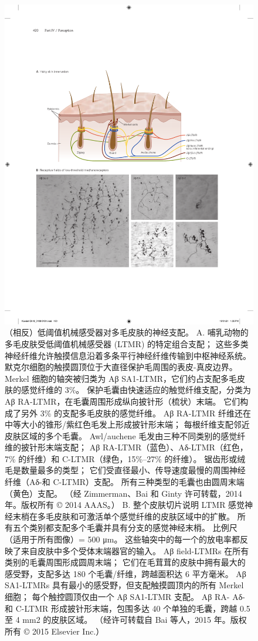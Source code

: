 \begin{figure}[htbp]
	\centering
	\includegraphics[width=1.0\linewidth]{chap18/fig_18_8}
	\caption{（相反）低阈值机械感受器对多毛皮肤的神经支配。
		A. 哺乳动物的多毛皮肤受低阈值机械感受器 (LTMR) 的特定组合支配； 这些多类神经纤维允许触摸信息沿着多条平行神经纤维传输到中枢神经系统。
		默克尔细胞的触摸圆顶位于大直径保护毛周围的表皮-真皮边界。
		Merkel 细胞的轴突被归类为 Aβ SA1-LTMR，它们约占支配多毛皮肤的感觉纤维的 3\%。
		保护毛囊由快速适应的触觉纤维支配，分类为 Aβ RA-LTMR，在毛囊周围形成纵向披针形（梳状）末端。
		它们构成了另外 3\% 的支配多毛皮肤的感觉纤维。
		Aβ RA-LTMR 纤维还在中等大小的锥形/紫红色毛发上形成披针形末端； 每根纤维支配邻近皮肤区域的多个毛囊。
		Awl/auchene 毛发由三种不同类别的感觉纤维的披针形末端支配； Aβ RA-LTMR（蓝色）、Aδ-LTMR（红色，7\% 的纤维）和 C-LTMR（绿色，15\%–27\% 的纤维）。
		锯齿形或绒毛是数量最多的类型； 它们受直径最小、传导速度最慢的周围神经纤维（Aδ-和 C-LTMR）支配。 
		所有三种类型的毛囊也由圆周末端（黄色）支配。 （经 Zimmerman、Bai 和 Ginty 许可转载，2014 年。版权所有 © 2014 AAAS。）
		B. 整个皮肤切片说明 LTMR 感觉神经末梢在多毛皮肤和可激活单个感觉纤维的皮肤区域中的扩散。
		所有五个类别都支配多个毛囊并具有分支的感觉神经末梢。
		比例尺（适用于所有图像）= 500 μm。 
		这些轴突中的每一个的放电率都反映了来自皮肤中多个受体末端器官的输入。
		Aβ field-LTMRs 在所有类别的毛囊周围形成圆周末端； 它们在毛茸茸的皮肤中拥有最大的感受野，支配多达 180 个毛囊/纤维，跨越面积达 6 平方毫米。
		Aβ SA1-LTMRs 具有最小的感受野，但支配触摸圆顶内的所有 Merkel 细胞； 每个触控圆顶仅由一个 Aβ SA1-LTMR 支配。
		Aβ RA- Aδ- 和 C-LTMR 形成披针形末端，包围多达 40 个单独的毛囊，跨越 0.5 至 4 mm2 的皮肤区域。 （经许可转载自 Bai 等人，2015 年。版权所有 © 2015 Elsevier Inc.）}
	\label{fig:18_8}
\end{figure}


